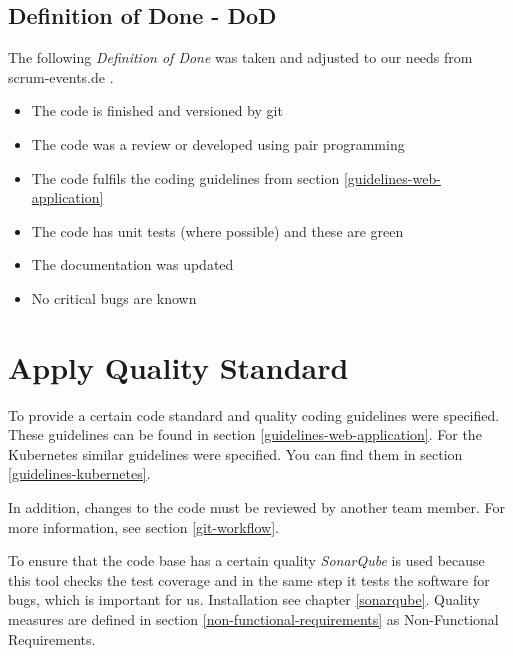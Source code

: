 \subsection{Definition of Done - DoD}
The following \textit{Definition of Done} was taken and adjusted to our needs from scrum-events.de \cite{www.scrum-events.de_dod}.
\begin{itemize}
  \item The code is finished and versioned by git
  \item The code was a review or developed using pair programming
  \item The code fulfils the coding guidelines from section \ref{guidelines-web-application}
  \item The code has unit tests (where possible) and these are green
  \item The documentation was updated
  \item No critical bugs are known
\end{itemize}

\section{Apply Quality Standard}
To provide a certain code standard and quality coding guidelines were specified.
These guidelines can be found in section \ref{guidelines-web-application}.
For the Kubernetes similar guidelines were specified.
You can find them in section \ref{guidelines-kubernetes}.

In addition, changes to the code must be reviewed by another team member.
For more information, see section \ref{git-workflow}.

To ensure that the code base has a certain quality \textit{SonarQube} is used because this tool checks the test coverage and in the same step it tests the software for bugs, which is important for us.
Installation see chapter \ref{sonarqube}.
Quality measures are defined in section \ref{non-functional-requirements} as Non-Functional Requirements.